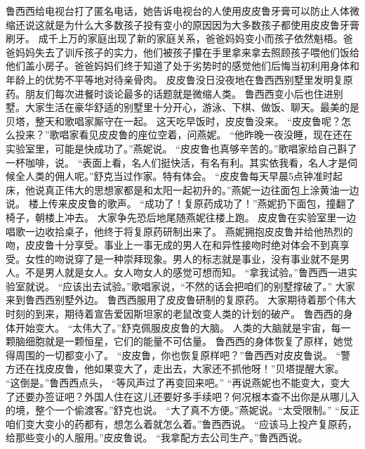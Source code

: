\documentclass[a4paper,12pt,UTF8,twoside]{ctexbook}
\begin{document}
        鲁西西给电视台打了匿名电话，她告诉电视台的人使用皮皮鲁牙膏可以防止人体微缩还说这就是为什么大多数孩子投有变小的原因因为大多数孩子都使用皮皮鲁牙膏刷牙。  
        成千上万的家庭出现了新的家庭关系，爸爸妈妈变小而孩子依然魁梧。爸爸妈妈失去了训斥孩子的实力，他们被孩子攥在手里拿来拿去照顾孩子喂他们饭给他们盖小房子。爸爸妈妈们终于知道了处于劣势时的感觉他们后悔当初利用身体和年龄上的优势不平等地对待亲骨肉。  
        皮皮鲁没日没夜地在鲁西西别墅里发明复原药。朋友们每次进餐时谈论最多的话题就是微缩人类。  
        鲁西西变小后也住进别墅。大家生活在豪华舒适的别墅里十分开心，游泳、下棋、做饭、聊天。最美的是贝塔，整天和歌唱家厮守在一起。  
        这天吃早饭时，皮皮鲁没来。  
        “皮皮鲁呢？怎么投来？”歌唱家看见皮皮鲁的座位空着，问燕妮。  
        “他昨晚一夜没睡，现在还在实验室里，可能是快成功了。”燕妮说。  
        “皮皮鲁也真够辛苦的。”歌唱家给自己斟了一杯咖啡，说。  
        “表面上看，名人们挺快活，有名有利。其实依我看，名人才是伺候全人类的佣人呢。”舒克当过作家。特有体会。  
        “皮皮鲁每天早晨5点钟准时起床，他说真正伟大的思想家都是和太阳一起初升的。”燕妮一边往面包上涂黄油一边说。  
        楼上传来皮皮鲁的歌声。  
        “成功了！复原药成功了！”燕妮扔下面包，撞翻了椅子，朝楼上冲去。  
        大家争先恐后地尾随燕妮往楼上跑。  
        皮皮鲁在实验室里一边唱歌一边收拾桌子，他终于将复原药研制出来了。  
        燕妮拥抱皮皮鲁并给他热烈的吻，皮皮鲁十分享受。事业上一事无成的男人在和异性接吻时绝对体会不到真享受。女性的吻说穿了是一种崇拜现象。男人的标志就是事业，没有事业就不是男人。不是男人就是女人。女人吻女人的感觉可想而知。  
        “拿我试验。”鲁西西一进实验室就说。  
        “应该出去试验。”歌唱家说，“不然的话会把咱们的别墅撑破了。”  
        大家来到鲁西西别墅外边。  
        鲁西西服用了皮皮鲁研制的复原药。  
        大家期待着那个伟大时刻的到来，期待着宣告爱因斯坦家的老鼠改变人类的计划的破产。  
        鲁西西的身体开始变大。  
        “太伟大了。”舒克佩服皮皮鲁的大脑。  
        人类的大脑就是宇宙，每一颗脑细胞就是一颗恒星，它们的能量不可估量。  
        鲁西西的身体恢复了原样，她觉得周围的一切都变小了。  
        “皮皮鲁，你也恢复原样吧？”鲁西西对皮皮鲁说。  
        “警方还在找皮皮鲁，他如果变大了，走出去，大家还不抓他呀！”贝塔提醒大家。  
        “这倒是。”鲁西西点头，  “等风声过了再变回来吧。”  
        “再说燕妮也不能变大，变大了还要办签证吧？外国人住在这儿还要好多手续吧？何况根本查不出你是从哪儿入的境，整个一个偷渡客。”舒克也说。  
        “大了真不方便。”燕妮说。“太受限制。”  
        “反正咱们变大变小的药都有，想怎么着就怎么着。”鲁西西说。  
        “应该马上投产复原药，给那些变小的人服用。”皮皮鲁说。  
        “我拿配方去公司生产。”鲁西西说。  
\end{document}
